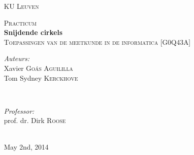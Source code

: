\begin{titlepage}
\thispagestyle{empty}
\newcommand{\HRule}{\rule{\linewidth}{0.5mm}}
\center
\textsc{\LARGE KU Leuven}\\[1.5cm]
\vfill

\textsc{\large Practicum}\\[0.5cm]
{ \Huge \bfseries Snijdende cirkels}\\[0.4cm]
\textsc{\large Toepassingen van de meetkunde in de informatica [G0Q43A]}\\[0.5cm]
\vfill

\begin{minipage}{0.4\textwidth}
\begin{flushleft} \large
\emph{Auteurs:}\\
Xavier \textsc{Go\'as Aguililla}\\
Tom Sydney \textsc{Kerckhove}
\end{flushleft}
\end{minipage}
~
\begin{minipage}{0.4\textwidth}
\begin{flushright} \large
\emph{Professor:} \\
prof. dr. Dirk \textsc{Roose}\\
\end{flushright}
\end{minipage}\\[4cm]

{\large May 2nd, 2014}\\[3cm]
\vfill

\end{titlepage}